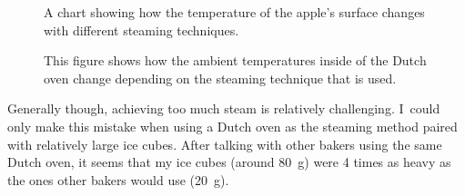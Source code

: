 \begin{figure}[ht]
  \centering
  
  \caption[Surface temperature versus steaming technique]{A chart showing how
      the temperature of the apple's surface changes with different
      steaming techniques.}%
  \label{fig:apple-experiment-surface-temperatures}
\end{figure}

\begin{figure}[ht]
  \centering
  
  \caption[Dutch Oven temperature versus steaming technique]{This figure shows
      how the ambient temperatures inside of the Dutch oven change depending
      on the steaming technique that is used.}%
  \label{fig:apple-experiment-ambient-temperatures}
\end{figure}

Generally though, achieving too much steam is relatively challenging. I~could only
make this mistake when using a Dutch oven as the steaming method paired with relatively
large ice cubes. After talking with other bakers using the same Dutch oven, it seems
that my ice cubes (around \qty{80}{\gram}) were 4 times as heavy as the ones
other bakers would use (\qty{20}{\gram}).
